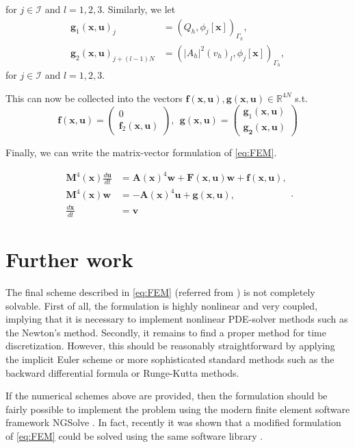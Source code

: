 for $j \in \mathcal{I} $ and $l = 1,2,3$. Similarly, we let
\[
    \begin{split}
\mathbf{g}_{1}( \mathbf{x}, \mathbf{u}) _{j} & = \left( Q_{h}, \phi _{j}\left[ \mathbf{x} \right]  \right) _{\Gamma _{h}}, \\
\mathbf{g}_{2}\left( \mathbf{x}, \mathbf{u} \right)_{j + (l-1)N} & = \left( \left\lvert A_{h} \right\rvert ^2 ( v_{h}) _{l}, \phi _{j} \left[ \mathbf{x} \right]  \right)     _{\Gamma _{h}},
    \end{split}
\]
for $j \in \mathcal{I} $ and $l=1,2,3$.

This can now be collected into the vectors $\mathbf{f}( \mathbf{x}, \mathbf{u}), \mathbf{g}(\mathbf{x},\mathbf{u} ) \in \mathbb{R} ^{4N}  $ s.t. \[
\mathbf{f}( \mathbf{x}, \mathbf{u}) = \begin{pmatrix}
0\\
\mathbf{f}_{2}(\mathbf{x},\mathbf{u} )
\end{pmatrix}
, \ \ \mathbf{g} (\mathbf{x}, \mathbf{u})
 = \begin{pmatrix}
\mathbf{g}_{1}( \mathbf{x}, \mathbf{u}) \\
\mathbf{g_{2}( \mathbf{x}, \mathbf{u}) }
\end{pmatrix}
\]

Finally, we can write the matrix-vector formulation of \eqref{eq:FEM}.

\begin{equation}
\label{eq:matrix_form}
\begin{split}
   \mathbf{M}^{4}( \mathbf{x}) \frac{d \mathbf{u}}{dt}    & = \mathbf{A}( \mathbf{x}) ^{4} \mathbf{w} +  \mathbf{F}( \mathbf{x}, \mathbf{u}) \mathbf{w} + \mathbf{f}( \mathbf{x}, \mathbf{u}),     \\
   \mathbf{M}^{4}( \mathbf{x}) \mathbf{w}    & =- \mathbf{A}( \mathbf{x}) ^{4} \mathbf{u}+  \mathbf{g}( \mathbf{x}, \mathbf{u}), \\
   \frac{d\mathbf{x}}{dt}  & = \mathbf{v}
\end{split}
.\end{equation}



\section{Further work}
The final scheme described in \eqref{eq:FEM} (referred from \cite{kovacs2021convergent}) is not completely solvable. First of all, the formulation is highly nonlinear and very coupled, implying that it is necessary to implement nonlinear PDE-solver methods such as the Newton's method. Secondly, it remains to find a proper method for time discretization. However, this should be reasonably straightforward by applying the implicit Euler scheme or more sophisticated standard methods such as the backward differential formula or Runge-Kutta methods.

If the numerical schemes above are provided, then the formulation should be fairly possible to implement the problem using the modern finite element software framework NGSolve \cite{schoberl2017netgen}. In fact, recently it was shown that a modified formulation of \eqref{eq:FEM} could be solved using the same software library \cite{hu2022evolving}.

